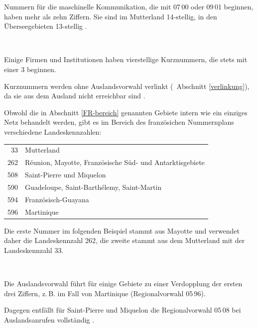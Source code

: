 \documentclass[numbers=noenddot]{scrreprt}
\newcommand*\vglAbschnitt[1]{(\cf\ Abschnitt \ref{#1})}
\begin{document}
Nummern für die maschinelle Kommunikation, die mit 07\,00 oder 09\,01 beginnen, haben mehr als zehn Ziffern. Sie sind im Mutterland 14-stellig, in den Überseegebieten 13-stellig \cite[17, 24]{ARCEP}.
\begin{sidebyside}
   \\
\end{sidebyside}

Einige Firmen und Institutionen haben vierstellige Kurznummern, die stets mit einer 3 beginnen.
\begin{sidebyside}
\end{sidebyside}
Kurznummern werden ohne Auslandsvorwahl verlinkt
\vglAbschnitt{verlinkung}, da sie aus dem Ausland nicht erreichbar sind \cite[29]{ARCEP}.

Obwohl die in Abschnitt \ref{FR-bereich} genannten Gebiete intern wie ein einziges Netz behandelt werden, gibt es im Bereich des französichen Nummernplans verschiedene Landeskennzahlen:
\begin{center}
\begin{tabular}{rl}
33 & Mutterland \\
262 & R\'eunion, Mayotte, Französische Süd- und Antarktisgebiete \\
508 & Saint-Pierre und Miquelon \\
590 & Guadeloupe, Saint-Barth\'elemy, Saint-Martin \\
594 & Französisch-Guayana \\
596 & Martinique \\
\end{tabular}
\end{center}
Die erste Nummer im folgenden Beispiel stammt aus Mayotte und verwendet daher die Landeskennzahl 262, die zweite stammt aus dem Mutterland mit der Landeskennzahl 33.
\begin{sidebyside}
   \\
\end{sidebyside}

Die Auslandsvorwahl führt für einige Gebiete zu einer Verdopplung der ersten drei Ziffern, z.\,B. im Fall von Martinique (Regionalvorwahl 05\,96).
\begin{sidebyside}
\end{sidebyside}
Dagegen entfällt für Saint-Pierre und Miquelon die Regionalvorwahl 05\,08 bei Auslandsanrufen vollständig \cite[12]{ARCEP}.
\begin{sidebyside}
\end{sidebyside}
\end{document}
